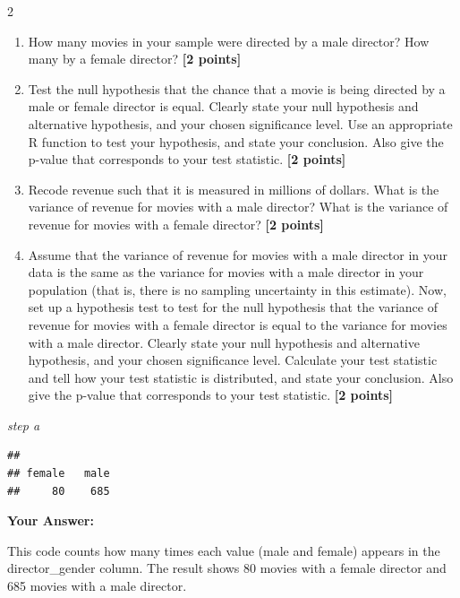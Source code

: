 \documentclass[
]{article}
\newenvironment{Shaded}{\begin{snugshade}}{\end{snugshade}}
\newcommand{\CommentTok}[1]{\textcolor[rgb]{0.56,0.35,0.01}{\textit{#1}}}
\newcommand{\FunctionTok}[1]{\textcolor[rgb]{0.13,0.29,0.53}{\textbf{#1}}}
\newcommand{\NormalTok}[1]{#1}
\newcommand{\SpecialCharTok}[1]{\textcolor[rgb]{0.81,0.36,0.00}{\textbf{#1}}}
\providecommand{\tightlist}{%
  \setlength{\itemsep}{0pt}\setlength{\parskip}{0pt}}
\begin{document}
2

\begin{enumerate}
\def\labelenumi{\alph{enumi}.}
\tightlist
\item
  How many movies in your sample were directed by a male director? How
  many by a female director? \textbf{[2 points]}
\item
  Test the null hypothesis that the chance that a movie is being
  directed by a male or female director is equal. Clearly state your
  null hypothesis and alternative hypothesis, and your chosen
  significance level. Use an appropriate R function to test your
  hypothesis, and state your conclusion. Also give the p-value that
  corresponds to your test statistic. \textbf{[2 points]}
\item
  Recode revenue such that it is measured in millions of dollars. What
  is the variance of revenue for movies with a male director? What is
  the variance of revenue for movies with a female director?
  \textbf{[2 points]}
\item
  Assume that the variance of revenue for movies with a male director in
  your data is the same as the variance for movies with a male director
  in your population (that is, there is no sampling uncertainty in this
  estimate). Now, set up a hypothesis test to test for the null
  hypothesis that the variance of revenue for movies with a female
  director is equal to the variance for movies with a male director.
  Clearly state your null hypothesis and alternative hypothesis, and
  your chosen significance level. Calculate your test statistic and tell
  how your test statistic is distributed, and state your conclusion.
  Also give the p-value that corresponds to your test statistic.
  \textbf{[2 points]}
\end{enumerate}

\emph{step a}

\begin{Shaded}
\end{Shaded}

\begin{verbatim}
## 
## female   male 
##     80    685
\end{verbatim}

\textbf{Your Answer:}

This code counts how many times each value (male and female) appears in
the director\_gender column. The result shows 80 movies with a female
director and 685 movies with a male director.
\end{document}
